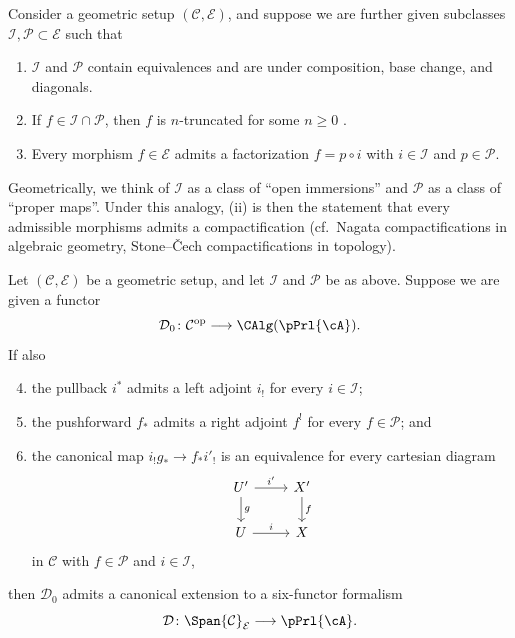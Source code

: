 Consider a geometric setup $(\mathcal C, \mathcal E)$, and suppose we are further given subclasses $\mathcal I, \mathcal P \subset \mathcal E$ such that
\begin{enumerate}[label=(\roman*)]
\item $\mathcal I$ and $\mathcal P$ contain equivalences and are under composition, base change, and diagonals.
\item If $f\in\mathcal I\cap\mathcal P$, then $f$ is $n$-truncated for some $n\geq 0$ \cite[Definition 5.5.6.8]{Lurie2009}. 
\item Every morphism $f \in \mathcal E$ admits a factorization $f = p \circ i$ with $i \in \mathcal I$ and $p \in \mathcal P$.
\end{enumerate}
Geometrically, we think of $\mathcal I$ as a class of ``open immersions'' and $\mathcal P$ as a class of ``proper maps''. Under this analogy, (ii) is then the statement that every admissible morphisms admits a compactification (cf.~Nagata compactifications in algebraic geometry, Stone--\v{C}ech compactifications in topology).
\begin{thm}\label{thm:construction-IP}
  Let $(\mathcal C, \mathcal E)$ be a geometric setup, and let $\mathcal I$ and $\mathcal P$ be as above. Suppose we are given a functor
  \[
    \mathcal D_0\colon\mathcal C^{\mathrm{op}}\longrightarrow\CAlg (\pPrl{\cA}).
  \]
  If also
  \begin{enumerate}[label=(\roman*)]
    \setcounter{enumi}{3}
  \item the pullback $i^*$ admits a left adjoint $i_!$ for every $i\in\mathcal I$;
  \item the pushforward $f_*$ admits a right adjoint $f^!$ for every $f \in \mathcal P$; and
  \item the canonical map $i_!g_*\to f_*i'_!$ is an equivalence for every cartesian diagram
    \[
      \begin{tikzcd}
        U'\arrow[r,"i'"]\arrow[d,"g"]
        & X'\arrow[d,"f"] \\
        U\arrow[r,"i"]
        & X
      \end{tikzcd}
    \]
    in $\mathcal C$ with $f\in\mathcal P$ and $i\in\mathcal I$,
  \end{enumerate}
  then $\mathcal D_0$ admits a canonical extension to a six-functor formalism
  \[
    \mathcal D\colon\Span{\mathcal C}_{\mathcal E}\longrightarrow \pPrl{\cA}.
  \]
\end{thm}

